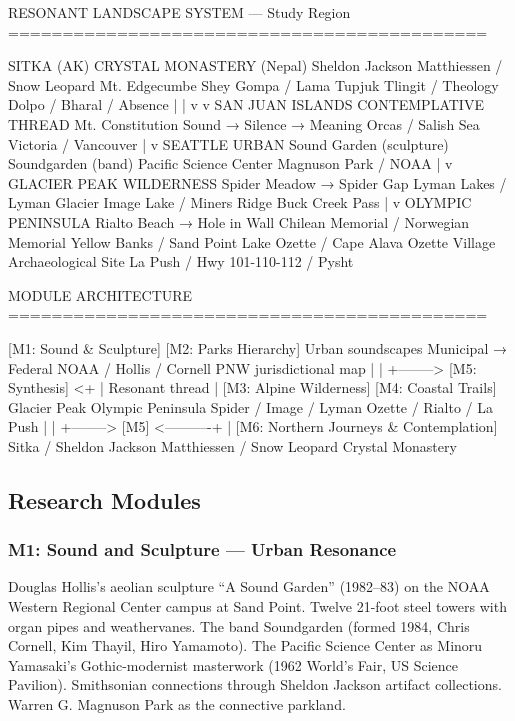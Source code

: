 \documentclass[11pt,letterpaper]{article}
\begin{document}
\begin{asciibox}
RESONANT LANDSCAPE SYSTEM — Study Region
============================================

SITKA (AK)                   CRYSTAL MONASTERY (Nepal)
  Sheldon Jackson               Matthiessen / Snow Leopard
  Mt. Edgecumbe                 Shey Gompa / Lama Tupjuk
  Tlingit / Theology            Dolpo / Bharal / Absence
       |                              |
       v                              v
  SAN JUAN ISLANDS          CONTEMPLATIVE THREAD
    Mt. Constitution            Sound → Silence → Meaning
    Orcas / Salish Sea
    Victoria / Vancouver
       |
       v
  SEATTLE URBAN
    Sound Garden (sculpture)
    Soundgarden (band)
    Pacific Science Center
    Magnuson Park / NOAA
       |
       v
  GLACIER PEAK WILDERNESS
    Spider Meadow → Spider Gap
    Lyman Lakes / Lyman Glacier
    Image Lake / Miners Ridge
    Buck Creek Pass
       |
       v
  OLYMPIC PENINSULA
    Rialto Beach → Hole in Wall
    Chilean Memorial / Norwegian Memorial
    Yellow Banks / Sand Point
    Lake Ozette / Cape Alava
    Ozette Village Archaeological Site
    La Push / Hwy 101-110-112 / Pysht
\end{asciibox}

\begin{asciibox}
MODULE ARCHITECTURE
============================================

  [M1: Sound & Sculpture]     [M2: Parks Hierarchy]
    Urban soundscapes            Municipal → Federal
    NOAA / Hollis / Cornell      PNW jurisdictional map
           |                           |
           +--------> [M5: Synthesis] <+
           |          Resonant thread  |
  [M3: Alpine Wilderness]    [M4: Coastal Trails]
    Glacier Peak                Olympic Peninsula
    Spider / Image / Lyman      Ozette / Rialto / La Push
           |                           |
           +--------> [M5] <----------+
                        |
  [M6: Northern Journeys & Contemplation]
    Sitka / Sheldon Jackson
    Matthiessen / Snow Leopard
    Crystal Monastery
\end{asciibox}

\subsection{Research Modules}

\subsubsection{M1: Sound and Sculpture — Urban Resonance}
Douglas Hollis's aeolian sculpture ``A Sound Garden'' (1982--83) on the NOAA Western Regional Center campus at Sand Point. Twelve 21-foot steel towers with organ pipes and weathervanes. The band Soundgarden (formed 1984, Chris Cornell, Kim Thayil, Hiro Yamamoto). The Pacific Science Center as Minoru Yamasaki's Gothic-modernist masterwork (1962 World's Fair, US Science Pavilion). Smithsonian connections through Sheldon Jackson artifact collections. Warren G. Magnuson Park as the connective parkland.
\end{document}
